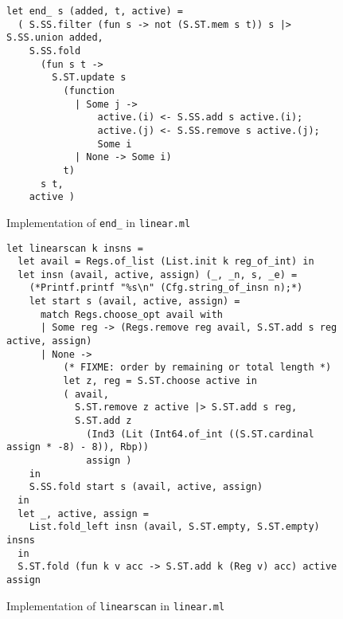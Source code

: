 \documentclass{article}
\begin{document}
\begin{figure}[H]
     \centering
     \begin{verbatim}
let end_ s (added, t, active) =
  ( S.SS.filter (fun s -> not (S.ST.mem s t)) s |> S.SS.union added,
    S.SS.fold
      (fun s t ->
        S.ST.update s
          (function
            | Some j ->
                active.(i) <- S.SS.add s active.(i);
                active.(j) <- S.SS.remove s active.(j);
                Some i
            | None -> Some i)
          t)
      s t,
    active )
     \end{verbatim}
     \caption{Implementation of \texttt{end\_} in \texttt{linear.ml}}\label{fig:end_-ocaml}
\end{figure}



\begin{figure}[H]
     \centering
     \begin{verbatim}
let linearscan k insns =
  let avail = Regs.of_list (List.init k reg_of_int) in
  let insn (avail, active, assign) (_, _n, s, _e) =
    (*Printf.printf "%s\n" (Cfg.string_of_insn n);*)
    let start s (avail, active, assign) =
      match Regs.choose_opt avail with
      | Some reg -> (Regs.remove reg avail, S.ST.add s reg active, assign)
      | None ->
          (* FIXME: order by remaining or total length *)
          let z, reg = S.ST.choose active in
          ( avail,
            S.ST.remove z active |> S.ST.add s reg,
            S.ST.add z
              (Ind3 (Lit (Int64.of_int ((S.ST.cardinal assign * -8) - 8)), Rbp))
              assign )
    in
    S.SS.fold start s (avail, active, assign)
  in
  let _, active, assign =
    List.fold_left insn (avail, S.ST.empty, S.ST.empty) insns
  in
  S.ST.fold (fun k v acc -> S.ST.add k (Reg v) acc) active assign
     \end{verbatim}
     \caption{Implementation of \texttt{linearscan} in \texttt{linear.ml}}\label{fig:linearscan-ocaml}
\end{figure}


%




\end{document}
